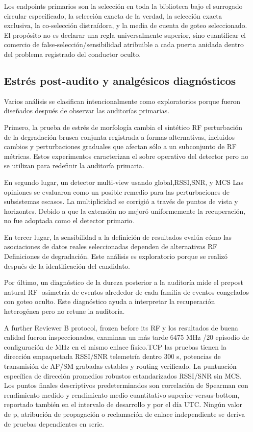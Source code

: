 \documentclass{ieeeaccess}
\begin{document}
Los endpoints primarios son la selección en toda la biblioteca bajo el surrogado circular especificado, la selección exacta de la verdad, la selección exacta exclusiva, la co-selección distraídora, y la media de cuenta de goteo seleccionado. El propósito no es declarar una regla universalmente superior, sino cuantificar el comercio de false-selección/sensibilidad atribuible a cada puerta anidada dentro del problema registrado del conductor oculto.

\subsection{Estrés post-audito y analgésicos diagnósticos}\label{estruxe9s-post-audito-y-analguxe9sicos-diagnuxf3sticos}

Varios análisis se clasifican intencionalmente como exploratorios porque fueron diseñados después de observar las auditorías primarias.

Primero, la prueba de estrés de morfología cambia el sintético RF perturbación de la degradación brusca conjunta registrada a formas alternativas, incluidos cambios y perturbaciones graduales que afectan sólo a un subconjunto de RF métricas. Estos experimentos caracterizan el sobre operativo del detector pero no se utilizan para redefinir la auditoría primaria.

En segundo lugar, un detector multi-view usando global,RSSI,SNR, y MCS Las opiniones se evaluaron como un posible remedio para las perturbaciones de subsistemas escasos. La multiplicidad se corrigió a través de puntos de vista y horizontes. Debido a que la extensión no mejoró uniformemente la recuperación, no fue adoptada como el detector primario.

En tercer lugar, la sensibilidad a la definición de resultados evalúa cómo las asociaciones de datos reales seleccionadas dependen de alternativas RF Definiciones de degradación. Este análisis es exploratorio porque se realizó después de la identificación del candidato.

Por último, un diagnóstico de la dureza posterior a la auditoría mide el prepost natural RF- asimetría de eventos alrededor de cada familia de eventos congelados con goteo oculto. Este diagnóstico ayuda a interpretar la recuperación heterogénea pero no retune la auditoría.

A further Reviewer B protocol, frozen before its RF y los resultados de buena calidad fueron inspeccionados, examinan un más tarde 6475 MHz /20 episodio de configuración de MHz en el mismo enlace físico.TCP las pruebas tienen la dirección empaquetada RSSI/SNR telemetría dentro 300 s, potencias de transmisión de AP/SM grabadas estables y routing verificado. La puntuación específica de dirección promedios robustos estandarizados RSSI/SNR sin MCS. Los puntos finales descriptivos predeterminados son correlación de Spearman con rendimiento medido y rendimiento medio cuantitativo superior-versus-bottom, reportado también en el intervalo de desarrollo y por el día UTC. Ningún valor de p, atribución de propagación o reclamación de enlace independiente se deriva de pruebas dependientes en serie.
\end{document}
